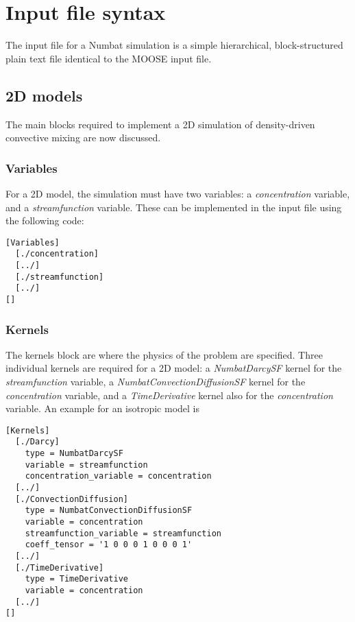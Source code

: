 \documentclass[11pt, a4paper]{csiroreport2012}
\begin{document}
\section{Input file syntax}

The input file for a Numbat simulation is a simple hierarchical, block-structured plain text file identical to the MOOSE input file.

\subsection{2D models}

The main blocks required to implement a 2D simulation of density-driven convective mixing are now discussed.
\subsubsection*{Variables}

For a 2D model, the simulation must have two variables: a \emph{concentration} variable, and a \emph{streamfunction} variable. These can be implemented in the input file using the following code:

\begin{shaded}
\begin{verbatim}
[Variables]
  [./concentration]
  [../]
  [./streamfunction]
  [../]
[]
\end{verbatim}
\end{shaded}

\subsubsection*{Kernels}

The kernels block are where the physics of the problem are specified. Three individual kernels are required for a 2D model: a \emph{NumbatDarcySF} kernel for the \emph{streamfunction} variable, a \emph{NumbatConvectionDiffusionSF} kernel for the \emph{concentration} variable, and a \emph{TimeDerivative} kernel also for the \emph{concentration} variable. An example for an isotropic model is

\begin{shaded}
\begin{verbatim}
[Kernels]
  [./Darcy]
    type = NumbatDarcySF
    variable = streamfunction
    concentration_variable = concentration
  [../]
  [./ConvectionDiffusion]
    type = NumbatConvectionDiffusionSF
    variable = concentration
    streamfunction_variable = streamfunction
    coeff_tensor = '1 0 0 0 1 0 0 0 1'
  [../]
  [./TimeDerivative]
    type = TimeDerivative
    variable = concentration
  [../]
[]
\end{verbatim}
\end{shaded}
\end{document}
